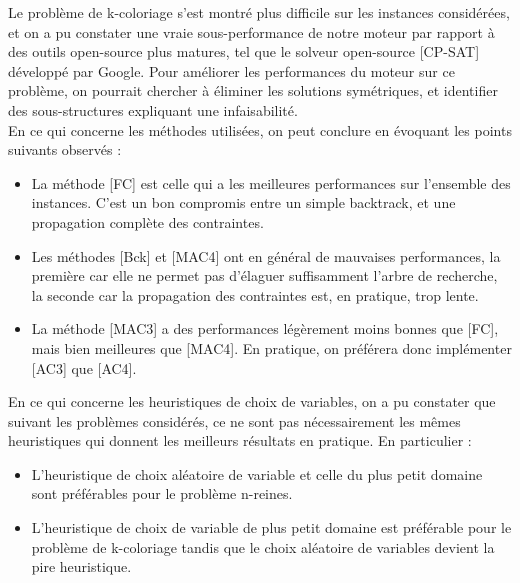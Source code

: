 \documentclass[14pt]{article}
\begin{document}
Le problème de k-coloriage s'est montré plus difficile sur les instances considérées, et on a pu constater une vraie sous-performance de notre moteur par rapport à des outils open-source plus matures, tel que le solveur open-source [CP-SAT] développé par Google. Pour améliorer les performances du moteur sur ce problème, on pourrait chercher à éliminer les solutions symétriques, et identifier des sous-structures expliquant une infaisabilité.\\

En ce qui concerne les méthodes utilisées, on peut conclure en évoquant les points suivants observés :

\begin{itemize}
	\item La méthode [FC] est celle qui a les meilleures performances sur l'ensemble des instances. C'est un bon compromis entre un simple backtrack, et une propagation complète des contraintes.
	\item Les méthodes [Bck] et [MAC4] ont en général de mauvaises performances, la première car elle ne permet pas d'élaguer suffisamment l'arbre de recherche, la seconde car la propagation des contraintes est, en pratique, trop lente.
	\item La méthode [MAC3] a des performances légèrement moins bonnes que [FC], mais bien meilleures que [MAC4]. En pratique, on préférera donc implémenter [AC3] que [AC4].\\
\end{itemize}


En ce qui concerne les heuristiques de choix de variables, on a pu constater que suivant les problèmes considérés, ce ne sont pas nécessairement les mêmes heuristiques qui donnent les meilleurs résultats en pratique. En particulier :

\begin{itemize}
	\item L'heuristique de choix aléatoire de variable et celle du plus petit domaine sont préférables pour le problème n-reines.
	\item L'heuristique de choix de variable de plus petit domaine est préférable pour le problème de k-coloriage tandis que le choix aléatoire de variables devient la pire heuristique.
\end{itemize}
\end{document}
